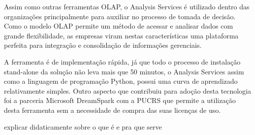 Assim como outras ferramentas OLAP, o Analysis Services é utilizado dentro das organizações principalmente para auxiliar no processo de tomada de decisão. Como o modelo OLAP permite um método de acessar e analisar dados com grande flexibilidade, as empresas viram nestas características uma plataforma perfeita para integração e consolidação de informações gerenciais.

A ferramenta é de implementação rápida, já que todo o processo de instalação stand-alone da solução não leva mais que 50 minutos, o Analysis Services assim como a linguagem de programação Python, possui uma curva de aprendizado relativamente simples. Outro aspecto que contribuiu para adoção desta tecnologia foi a parceria Microsoft DreamSpark com a PUCRS que permite a utilização desta ferramenta sem a necessidade de compra das suas licenças de uso.

explicar didaticamente sobre o que é e pra que serve
